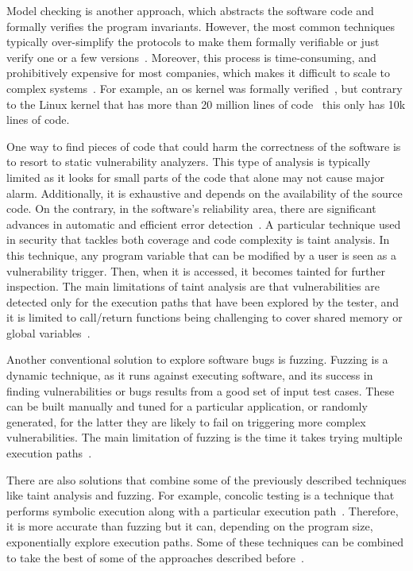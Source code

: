Model checking is another approach, which abstracts the software code and formally verifies the program invariants.
However, the most common techniques typically over-simplify the protocols to make them formally verifiable or just verify one or a few versions~\cite{Klein:2009,Chen:2015,Nelson:2017}. 
Moreover, this process is time-consuming, and prohibitively expensive for most companies, which makes it difficult to scale to complex systems~\cite{Giuffrida:2013}.
For example, an \gls{os} kernel was formally verified~\cite{Klein:2009}, but contrary to the Linux kernel that has more than 20 million lines of code~\cite{linux_kernel} this only has 10k lines of code.


One way to find pieces of code that could harm the correctness of the software is to resort to static vulnerability analyzers.
This type of analysis is typically limited as it looks for small parts of the code that alone may not cause major alarm.
Additionally, it is exhaustive and depends on the availability of the source code.
On the contrary, in the software's reliability area, there are significant advances in automatic and efficient error detection~\cite{Xu:2016}.
A particular technique used in security that tackles both coverage and code complexity is taint analysis.
In this technique, any program variable that can be modified by a user is seen as a vulnerability trigger. 
Then, when it is accessed, it becomes tainted for further inspection.
The main limitations of taint analysis are that vulnerabilities are detected only for the execution paths that have been explored by the tester, and it is limited to call/return functions being challenging to cover shared memory or global variables~\cite{Yamaguchi:2015}.


Another conventional solution to explore software bugs is fuzzing.
Fuzzing is a dynamic technique, as it runs against executing software, and its success in finding vulnerabilities or bugs results from a good set of input test cases.
These can be built manually and tuned for a particular application, or randomly generated, for the latter they are likely to fail on triggering more complex vulnerabilities.
The main limitation of fuzzing is the time it takes trying multiple execution paths~\cite{Gan:2018}.


There are also solutions that combine some of the previously described techniques like taint analysis and fuzzing.
For example, concolic testing is a technique that performs symbolic execution along with a particular execution path~\cite{Kim:2017b}. 
Therefore, it is more accurate than fuzzing but it can, depending on the program size, exponentially explore execution paths.
Some of these techniques can be combined to take the best of some of the approaches described before~\cite{Stephens:2016}.


